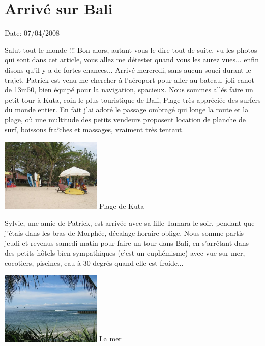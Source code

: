 \section{Arrivé sur Bali}

Date: 07/04/2008

\begin{multicols}{2}

Salut tout le monde !!! Bon alors, autant vous le dire tout de suite, vu les photos qui sont dans cet article, vous allez me détester quand vous les aurez vues... enfin disons qu'il y a de fortes chances... Arrivé mercredi, sans aucun souci durant le trajet, Patrick est venu me chercher à l'aéroport pour aller au bateau, joli canot de 13m50, bien équipé pour la navigation, spacieux. Nous sommes allés faire un petit tour à Kuta, coin le plus touristique de Bali, Plage très appréciée des surfers du monde entier. En fait j'ai adoré le passage ombragé qui longe la route et la plage, où une multitude des petits vendeurs proposent location de planche de surf, boissons fraîches et massages, vraiment très tentant.

\hspace*{-0.65cm}
\includegraphics[width=4.8cm]{articles/Arrivee-sur-bali/1207567562ikVd.jpg}
Plage de Kuta

Sylvie, une amie de Patrick, est arrivée avec sa fille Tamara le soir, pendant que j'étais dans les bras de Morphée, décalage horaire oblige. Nous somme partis jeudi et revenus samedi matin pour faire un tour dans Bali, en s'arrêtant dans des petits hôtels bien sympathiques (c'est un euphémisme) avec vue sur mer, cocotiers, piscines, eau à 30 degrés quand elle est froide...

\hspace*{-0.65cm}
\includegraphics[width=4.8cm]{articles/Arrivee-sur-bali/1207567561DqJk.jpg}
La mer


\end{multicols}
